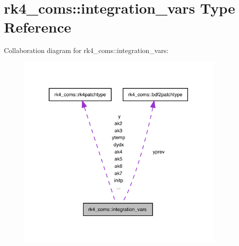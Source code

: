 \hypertarget{structrk4__coms_1_1integration__vars}{}\section{rk4\+\_\+coms\+:\+:integration\+\_\+vars Type Reference}
\label{structrk4__coms_1_1integration__vars}


Collaboration diagram for rk4\+\_\+coms\+:\+:integration\+\_\+vars\+:
\nopagebreak
\begin{figure}[H]
\begin{center}
\leavevmode
\includegraphics[width=294pt]{structrk4__coms_1_1integration__vars__coll__graph}
\end{center}
\end{figure}
